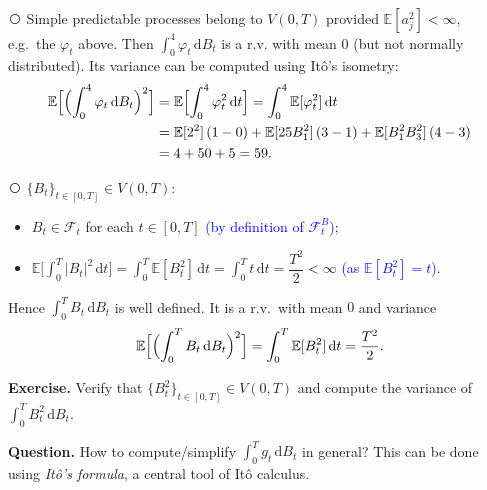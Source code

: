 \documentclass[11pt]{article}
\newcommand{\E}{\mathbb{E}}
\newcommand{\F}{\mathcal{F}}
\newcommand{\dd}{\,\mathrm{d}}
\newcommand{\cnum}[1]{\textcircled{\raisebox{-0.6pt}{\scriptsize #1}}} %
\newcommand{\ann}[1]{\textcolor{blue}{#1}}
\theoremstyle{definition}
\begin{document}
\medskip
\noindent\cnum{2} Simple predictable processes belong to $V(0,T)$ provided
$\E[a_j^2]<\infty$, e.g.\ the $\varphi_t$ above. Then $\int_0^4\varphi_t\dd B_t$ is a r.v.
with mean $0$ (but not normally distributed). Its variance can be computed using
It\^o's isometry:
\begin{align*}
  \E\Bigl[\Bigl(\int_0^4\varphi_t\dd B_t\Bigr)^2\Bigr]
    &= \E\Bigl[\int_0^4\varphi_t^2\dd t\Bigr]
     = \int_0^4\E[\varphi_t^2]\dd t\\
    &= \E[2^2]\,(1-0)+\E[25B_1^2]\,(3-1)+\E[B_1^2B_3^2]\,(4-3)\\
    &= 4+50+5=59 .
\end{align*}

\medskip
\noindent\cnum{3} $\{B_t\}_{t\in[0,T]}\in V(0,T)$:
\begin{itemize}
\item $B_t\in\F_t$ for each $t\in[0,T]$ \ann{(by definition of $\F_t^B$)};
\item $\E\bigl[\int_0^T|B_t|^2\dd t\bigr]=\int_0^T\E[B_t^2]\dd t=\int_0^Tt\dd t
      =\dfrac{T^2}{2}<\infty$ \ann{(as $\E[B_t^2]=t$)}.
\end{itemize}
Hence $\int_0^TB_t\dd B_t$ is well defined. It is a r.v.\ with mean $0$ and variance
\[
  \E\Bigl[\Bigl(\int_0^TB_t\dd B_t\Bigr)^2\Bigr]=\int_0^T\E[B_t^2]\dd t=\frac{T^2}{2} .
\]

\medskip
\noindent\textbf{Exercise.} Verify that $\{B_t^2\}_{t\in[0,T]}\in V(0,T)$ and compute the
variance of $\int_0^TB_t^2\dd B_t$.

\medskip
\noindent\textbf{Question.} How to compute/simplify $\int_0^Tg_t\dd B_t$ in general?
This can be done using \emph{It\^o's formula}, a central tool of It\^o calculus.
\end{document}
